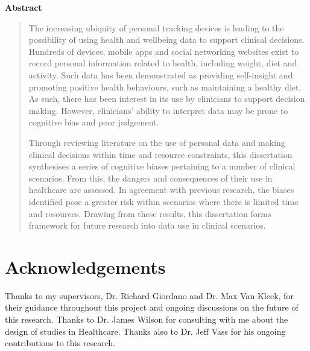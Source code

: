\documentclass[a4paper]{scrartcl}     %
\begin{document}
\thispagestyle{empty}
\null\vspace{\fill}
\begin{center}
  {\large \textsf{\textbf{Abstract}}}
\end{center}
\begin{abstract}
  The increasing ubiquity of personal tracking devices is leading to the possibility of using health and wellbeing data to support clinical decisions. Hundreds of devices, mobile apps and social networking websites exist to record personal information related to health, including weight, diet and activity. Such data has been demonstrated as providing self-insight and promoting positive health behaviours, such as maintaining a healthy diet. As such, there has been interest in its use by clinicians to support decision making. However, clinicians' ability to interpret data may be prone to cognitive bias and poor judgement.

  Through reviewing literature on the use of personal data and making clinical decisions within time and resource constraints, this dissertation synthesises a series of cognitive biases pertaining to a number of clinical scenarios. From this, the dangers and consequences of their use in healthcare are assessed. In agreement with previous research, the biases identified pose a greater risk within scenarios where there is limited time and resources. Drawing from these results, this dissertation forms framework for future research into data use in clinical scenarios.

\end{abstract}
\vspace{\fill}

\clearpage\thispagestyle{empty}\tableofcontents

\clearpage\section{Acknowledgements}

  Thanks to my supervisors, Dr. Richard Giordano and Dr. Max Van Kleek, for their guidance throughout this project and ongoing discussions on the future of this research. Thanks to Dr. James Wilson for consulting with me about the design of studies in Healthcare. Thanks also to Dr. Jeff Vass for his ongoing contributions to this research.
\end{document}

